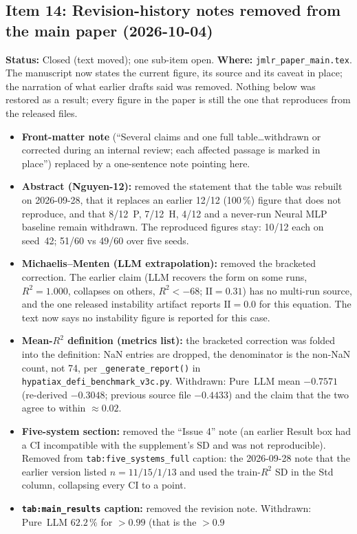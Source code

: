 \documentclass[11pt]{article}
\newcommand{\Rsq}{R^{2}}
\newcommand{\II}{\mathrm{II}}
\begin{document}
\subsection*{Item 14: Revision-history notes removed from the main paper (2026-10-04)}
\textbf{Status:} Closed (text moved); one sub-item open. \textbf{Where:} \texttt{jmlr\_paper\_main.tex}. The manuscript
now states the current figure, its source and its caveat in place; the narration of what earlier drafts said was removed.
Nothing below was restored as a result; every figure in the paper is still the one that reproduces from the released files.
\begin{itemize}\small
\item \textbf{Front-matter note} (``Several claims and one full table\ldots withdrawn or corrected during an internal review;
each affected passage is marked in place'') replaced by a one-sentence note pointing here.
\item \textbf{Abstract (Nguyen-12):} removed the statement that the table was rebuilt on 2026-09-28, that it replaces an
earlier 12/12 (100\,\%) figure that does not reproduce, and that 8/12~P, 7/12~H, 4/12 and a never-run Neural MLP baseline
remain withdrawn. The reproduced figures stay: 10/12 each on seed~42; 51/60 vs 49/60 over five seeds.
\item \textbf{Michaelis--Menten (LLM extrapolation):} removed the bracketed correction. The earlier claim (LLM recovers the form on
some runs, $\Rsq=1.000$, collapses on others, $\Rsq<-68$; $\II=0.31$) has no multi-run source, and the one released
instability artifact reports $\II=0.0$ for this equation. The text now says no instability figure is reported for this case.
\item \textbf{Mean-$\Rsq$ definition (metrics list):} the bracketed correction was folded into the definition: NaN entries are dropped,
the denominator is the non-NaN count, not 74, per \texttt{\_generate\_report()} in \texttt{hypatiax\_defi\_benchmark\_v3c.py}.
Withdrawn: Pure~LLM mean $-0.7571$ (re-derived $-0.3048$; previous source file $-0.4433$) and the claim that the two agree to within
$\approx0.02$.
\item \textbf{Five-system section:} removed the ``Issue 4'' note (an earlier Result box had a CI incompatible with the supplement's SD and
was not reproducible). Removed from \texttt{tab:five\_systems\_full} caption: the 2026-09-28 note that the earlier version listed
$n=11/15/1/13$ and used the train-$\Rsq$ SD in the Std column, collapsing every CI to a point.
\item \textbf{\texttt{tab:main\_results} caption:} removed the revision note. Withdrawn: Pure~LLM $62.2\,\%$ for $>0.99$ (that is the $>0.9$

\end{itemize}
\end{document}
